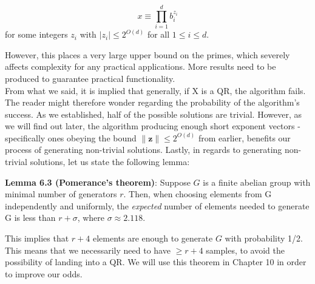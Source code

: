 \begin{equation}
    x \equiv \prod_{i=1}^d b_i^{z_i} 
\end{equation}
for some integers $z_i$ with $\lvert z_i\rvert \leq 2^{O(d)}$ for all $1\leq i \leq d$.

However, this places a very large upper bound on the primes, which severely affects complexity for any practical applications. More results need to be produced to guarantee practical functionality.\\

From what we said, it is implied that generally, if X is a QR, the algorithm fails. The reader might therefore wonder regarding the probability of the algorithm's success. As we established, half of the possible solutions are trivial. However, as we will find out later, the algorithm producing enough short exponent vectors -specifically ones obeying the bound $\lVert \mathbf{z} \rVert \leq 2^{O(d)}$ from earlier, benefits our process of generating non-trivial solutions. Lastly, in regards to generating non-trivial solutions, let us state the following lemma:

\textbf{Lemma 6.3 (Pomerance's theorem)}:
Suppose $G$ is a finite abelian group with minimal number of generators
$r$. Then, when choosing elements from G independently and uniformly, the \textit{expected} number of
elements needed to generate G is less than $r + \sigma$, where $\sigma \approx 2.118$. 

This implies that $r+4$ elements are enough to generate $G$ with probability 1/2. This means that we necessarily need to have $\geq r+4$ samples, to avoid the possibility of landing into a QR. We will use this theorem in Chapter 10 in order to improve our odds.




